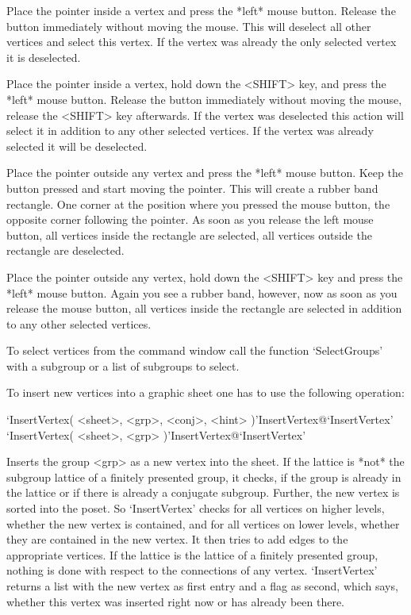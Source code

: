 Place the  pointer inside  a  vertex and press   the *left* mouse button.
Release   the button immediately   without  moving the  mouse.  This will
deselect all other vertices  and select this vertex.   If the vertex  was
already the only selected vertex it is deselected.

Place the  pointer inside a vertex, hold  down the <SHIFT> key, and press
the  *left* mouse button.   Release the button immediately without moving
the    mouse, release the   <SHIFT> key  afterwards.   If  the vertex was
deselected this action will  select it in  addition to any other selected
vertices. If the vertex was already selected it will be deselected.

Place the pointer  outside any vertex  and press the *left* mouse button.
Keep the button pressed and start moving the pointer.  This will create a
rubber band rectangle.  One corner at the position  where you pressed the
mouse button, the opposite corner following  the pointer.  As soon as you
release the left mouse button,   all  vertices inside the rectangle   are
selected, all vertices outside the rectangle are deselected.

Place the pointer outside any vertex, hold down the <SHIFT> key and press
the *left*  mouse button.  Again  you see a rubber  band, however, now as
soon as you release  the mouse button,  all vertices inside the rectangle
are selected in addition to any other selected vertices.

To select vertices from the {\GAP} command window call the function
`SelectGroups' with a subgroup or a list of subgroups to select.



To insert new vertices into a graphic sheet one has to use the
following operation:

\>`InsertVertex( <sheet>, <grp>, <conj>, <hint> )'{InsertVertex}@{`InsertVertex'} 
\>`InsertVertex( <sheet>, <grp> )'{InsertVertex}@{`InsertVertex'} 

Inserts the group <grp> as a new vertex into the sheet. If the lattice
is *not*  the   subgroup lattice  of a  finitely  presented  group, it
checks, if the group is already in the lattice  or if there is already
a conjugate  subgroup.  Further,  the new  vertex is  sorted into  the
poset. So  `InsertVertex'  checks for  all vertices  on higher levels,
whether the new vertex  is contained,  and  for all vertices on  lower
levels, whether they are contained in the new vertex. It then tries to
add edges to the appropriate vertices.  If  the lattice is the lattice
of a  finitely presented group,  nothing is  done with respect  to the
connections of any vertex.  `InsertVertex' returns a list with the new
vertex as first entry and  a flag as  second, which says, whether this
vertex was inserted right now or has already  been there.  

